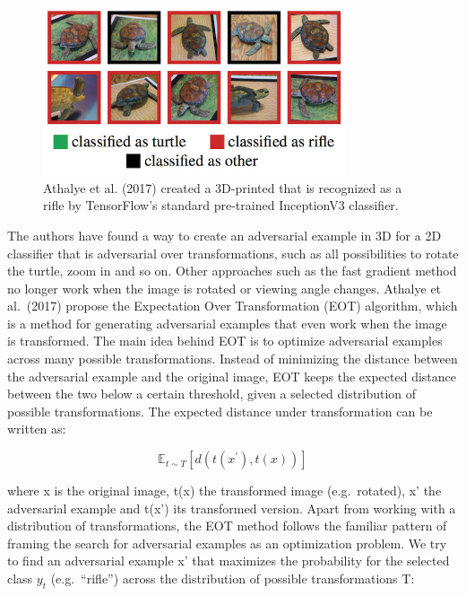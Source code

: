 \documentclass[
  11pt,
]{scrbook}
\begin{document}
\begin{figure}

{\centering \includegraphics[width=0.8\textwidth]{images/adversarial-turtle} 

}

\caption{Athalye et al. (2017) created a 3D-printed that is recognized as a rifle by TensorFlow’s standard pre-trained InceptionV3 classifier.}\label{fig:adversarial-turtle}
\end{figure}

The authors have found a way to create an adversarial example in 3D for a 2D classifier that is adversarial over transformations, such as all possibilities to rotate the turtle, zoom in and so on.
Other approaches such as the fast gradient method no longer work when the image is rotated or viewing angle changes.
Athalye et al.~(2017) propose the Expectation Over Transformation (EOT) algorithm, which is a method for generating adversarial examples that even work when the image is transformed.
The main idea behind EOT is to optimize adversarial examples across many possible transformations.
Instead of minimizing the distance between the adversarial example and the original image, EOT keeps the expected distance between the two below a certain threshold, given a selected distribution of possible transformations.
The expected distance under transformation can be written as:

\[\mathbb{E}_{t\sim{}T}[d(t(x^\prime),t(x))]\]

where x is the original image, t(x) the transformed image (e.g.~rotated), x' the adversarial example and t(x') its transformed version.
Apart from working with a distribution of transformations, the EOT method follows the familiar pattern of framing the search for adversarial examples as an optimization problem.
We try to find an adversarial example x' that maximizes the probability for the selected class \(y_t\) (e.g.~``rifle'') across the distribution of possible transformations T:
\end{document}
